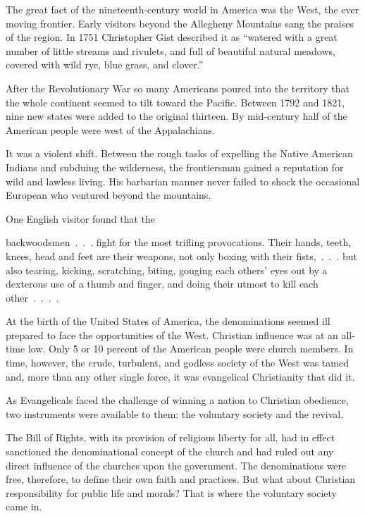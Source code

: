 The great fact of the nineteenth-century world in America was the West, the ever moving frontier.
Early visitors beyond the Allegheny Mountains sang the praises of the region. In 1751 Christopher
Gist described it as “watered with a great number of little streams and rivulets, and full of
beautiful natural meadows, covered with wild rye, blue grass, and clover.”

After the Revolutionary War so many Americans poured into the territory that the whole continent
seemed to tilt toward the Pacific. Between 1792 and 1821, nine new states were added to the original
thirteen. By mid-century half of the American people were west of the Appalachians.

It was a violent shift. Between the rough tasks of expelling the Native American Indians and
subduing the wilderness, the frontiersman gained a reputation for wild and lawless living. His
barbarian manner never failed to shock the occasional European who ventured beyond the mountains.

One English visitor found that the

\begin{blockquote}
backwoodsmen~.~.~. fight for the most trifling provocations. Their hands, teeth, knees, head and
feet are their weapons, not only boxing with their fists,~.~.~. but also tearing, kicking,
scratching, biting, gouging each others’ eyes out by a dexterous use of a thumb and finger, and
doing their utmost to kill each other~.~.~.~.
\end{blockquote}

At the birth of the United States of America, the denominations seemed ill prepared to face the
opportunities of the West. Christian influence was at an all-time low. Only 5 or 10 percent of the
American people were church members. In time, however, the crude, turbulent, and godless society of
the West was tamed and, more than any other single force, it was evangelical Christianity that did
it.

As Evangelicals faced the challenge of winning a nation to Christian obedience, two instruments were
available to them: the voluntary society and the revival.

The Bill of Rights, with its provision of religious liberty for all, had in effect sanctioned the
denominational concept of the church and had ruled out any direct influence of the churches upon the
government. The denominations were free, therefore, to define their own faith and practices. But
what about Christian responsibility for public life and morals? That is where the voluntary society
came in.

